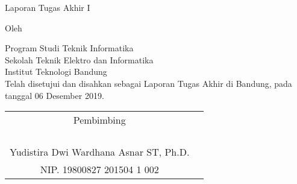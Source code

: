 \clearpage
\pagestyle{empty}

\begin{center}
\smallskip

    \Large \bfseries \MakeUppercase{\thetitle}
    \vfill

    \Large Laporan Tugas Akhir I
    \vfill

    \large Oleh

    \Large \theauthor

    \large Program Studi Teknik Informatika \\
    Sekolah Teknik Elektro dan Informatika \\
    Institut Teknologi Bandung \\

    \vfill
    \normalsize \normalfont
    Telah disetujui dan disahkan sebagai Laporan Tugas Akhir di Bandung, pada tanggal 06 Desember 2019.

    \vfill
    \setlength{\tabcolsep}{12pt}
    \begin{tabular}{c@{\hskip 0in}c}
        Pembimbing\\
        & \\
        & \\
        & \\
        & \\
        Yudistira Dwi Wardhana Asnar ST, Ph.D. \\
        NIP. 19800827 201504 1 002 \\
    \end{tabular}

\end{center}
\clearpage
